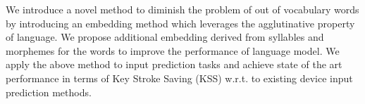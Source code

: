 We introduce a novel method to diminish the problem of out of vocabulary words by introducing an embedding method which leverages the agglutinative property of language. We propose additional embedding derived from syllables and morphemes for the words to improve the performance of language model. We apply the above method to input prediction tasks and achieve state of the art performance in terms of Key Stroke Saving (KSS) w.r.t. to existing device input prediction methods.
